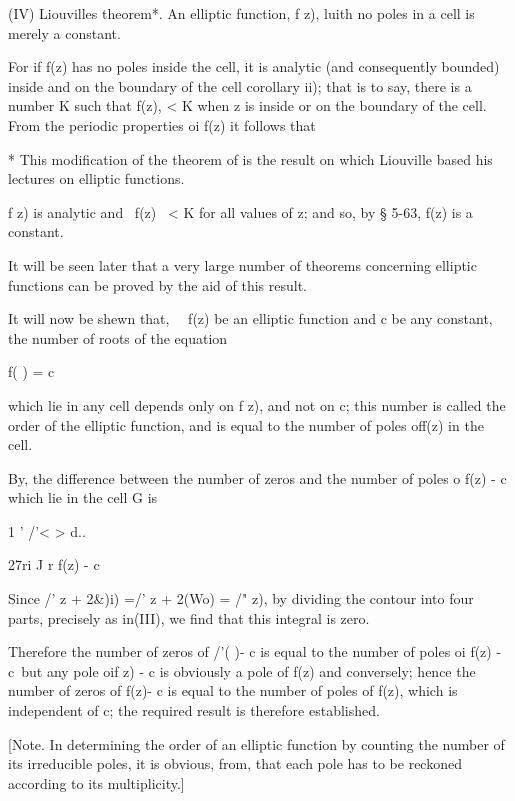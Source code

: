 (IV) Liouvilles theorem*. An elliptic function, f z), luith no poles
in a cell is merely a constant.

For if f(z) has no poles inside the cell, it is analytic (and
consequently bounded) inside and on the boundary of the cell 
corollary ii); that is to say, there is a number K such that f(z), <
K when z is inside or on the boundary of the cell. From the periodic
properties oi f(z) it follows that

* This modification of the theorem of is the result on which
Liouville based his lectures on elliptic functions.

%
%

f z) is analytic and \ f(z) \ < K for all values of z; and so, by §
5-63, f(z) is a constant.

It will be seen later that a very large number of theorems concerning
elliptic functions can be proved by the aid of this result.


It will now be shewn that, \ \ f(z) be an elliptic function and c be
any constant, the number of roots of the equation

f( ) = c

which lie in any cell depends only on f z), and not on c; this number
is called the order of the elliptic function, and is equal to the
number of poles off(z) in the cell.

By, the difference between the number of zeros and the number
of poles o f(z) - c which lie in the cell G is

1 ' /'< > d..

27ri J r f(z) - c

Since /' z + 2\&)i) =/' z + 2(Wo) = /" z), by dividing the contour
into four parts, precisely as in(III), we find that this
integral is zero.

Therefore the number of zeros of /'( )- c is equal to the number of
poles oi f(z) - c\ but any pole oif z) - c is obviously a pole of f(z)
and conversely; hence the number of zeros of f(z)- c is equal to the
number of poles of f(z), which is independent of c; the required
result is therefore established.

[Note. In determining the order of an elliptic function by counting
the number of its irreducible poles, it is obvious, from, that
each pole has to be reckoned according to its multiplicity.]

